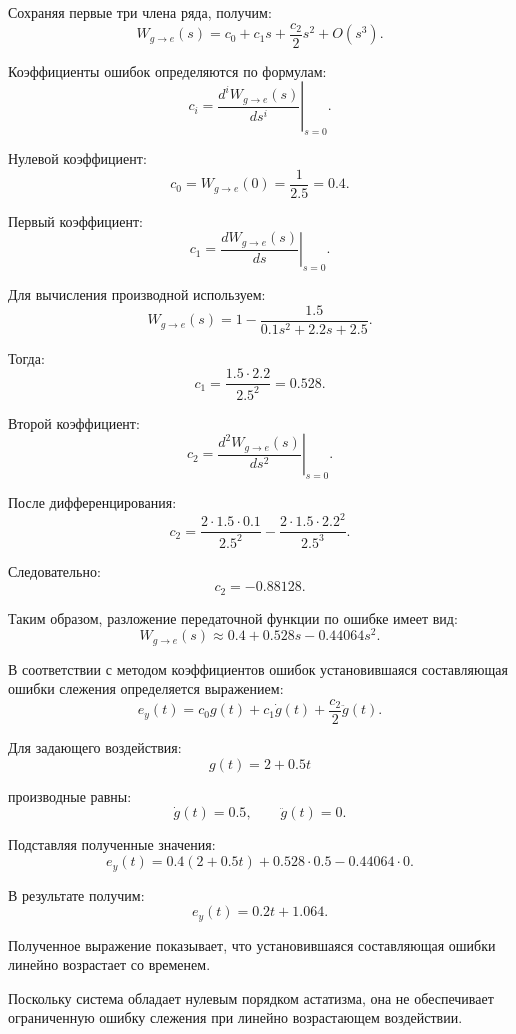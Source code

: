 \documentclass[12pt, a4paper]{article}
\begin{document}
Сохраняя первые три члена ряда, получим:
\begin{equation}
    W_{g\to e}(s)=
    c_0+c_1s+\frac{c_2}{2}s^2+O(s^3).
\end{equation}

Коэффициенты ошибок определяются
по формулам:
\[
    c_i=
    \left.
    \frac{d^iW_{g\to e}(s)}{ds^i}
    \right|_{s=0}.
\]

Нулевой коэффициент:
\[
    c_0=W_{g\to e}(0)
    =\frac{1}{2.5}=0.4.
\]

Первый коэффициент:
\[
    c_1=
    \left.
    \frac{dW_{g\to e}(s)}{ds}
    \right|_{s=0}.
\]

Для вычисления производной используем:
\[
    W_{g\to e}(s)=
    1-\frac{1.5}{0.1s^2+2.2s+2.5}.
\]

Тогда:
\[
    c_1=
    \frac{1.5\cdot2.2}{2.5^2}
    =0.528.
\]

Второй коэффициент:
\[
    c_2=
    \left.
    \frac{d^2W_{g\to e}(s)}{ds^2}
    \right|_{s=0}.
\]

После дифференцирования:
\[
    c_2=
    \frac{2\cdot1.5\cdot0.1}{2.5^2}
    -
    \frac{2\cdot1.5\cdot2.2^2}{2.5^3}.
\]

Следовательно:
\[
    c_2=-0.88128.
\]

Таким образом, разложение передаточной
функции по ошибке имеет вид:
\[
    W_{g\to e}(s)\approx
    0.4+0.528s-0.44064s^2.
\]

В соответствии с методом коэффициентов
ошибок установившаяся составляющая
ошибки слежения определяется выражением:
\begin{equation}
    e_y(t)=
    c_0g(t)+c_1\dot{g}(t)
    +\frac{c_2}{2}\ddot{g}(t).
\end{equation}

Для задающего воздействия:
\[
    g(t)=2+0.5t
\]

производные равны:
\[
    \dot{g}(t)=0.5,
    \qquad
    \ddot{g}(t)=0.
\]

Подставляя полученные значения:
\[
    e_y(t)=
    0.4(2+0.5t)
    +0.528\cdot0.5
    -0.44064\cdot0.
\]

В результате получим:
\begin{equation}
    \boxed{
    e_y(t)=0.2t+1.064
    }.
\end{equation}

Полученное выражение показывает,
что установившаяся составляющая ошибки
линейно возрастает со временем.

Поскольку система обладает нулевым
порядком астатизма, она не обеспечивает
ограниченную ошибку слежения
при линейно возрастающем воздействии.
\end{document}
